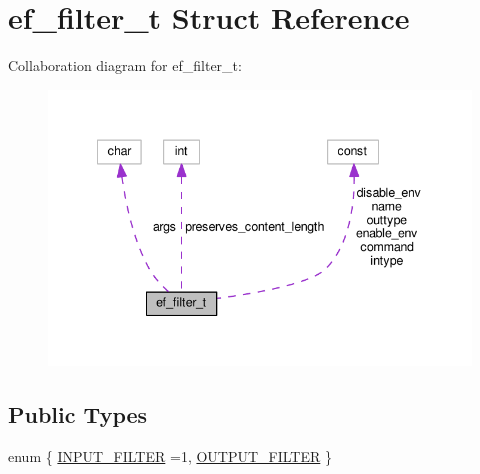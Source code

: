 \hypertarget{structef__filter__t}{}\section{ef\+\_\+filter\+\_\+t Struct Reference}
\label{structef__filter__t}


Collaboration diagram for ef\+\_\+filter\+\_\+t\+:
\nopagebreak
\begin{figure}[H]
\begin{center}
\leavevmode
\includegraphics[width=341pt]{structef__filter__t__coll__graph}
\end{center}
\end{figure}
\subsection*{Public Types}
\begin{DoxyCompactItemize}
\item 
enum \{ \hyperlink{structef__filter__t_a6ebd0261fcd0aff90d1378842451cd85a71bf59cda8ad2bb5abe6aaff3d3a0723}{I\+N\+P\+U\+T\+\_\+\+F\+I\+L\+T\+ER} =1, 
\hyperlink{structef__filter__t_a6ebd0261fcd0aff90d1378842451cd85ac4b7c23680671a6fc07a4797c643fadf}{O\+U\+T\+P\+U\+T\+\_\+\+F\+I\+L\+T\+ER}
 \}
\end{DoxyCompactItemize}
